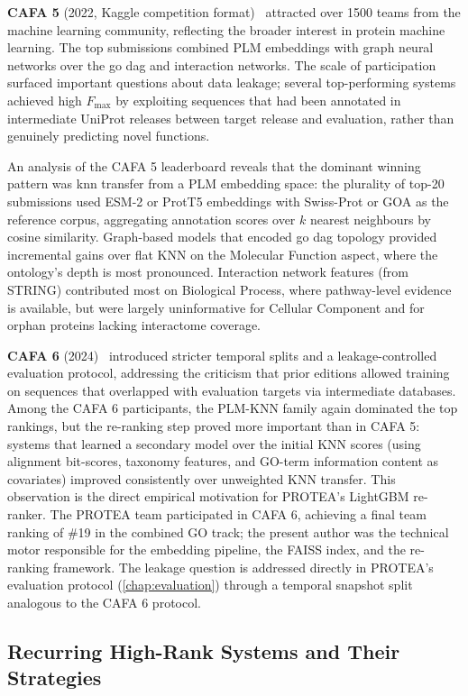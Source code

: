 \textbf{CAFA 5} (2022, Kaggle competition format)~\cite{cafa5_2023} attracted
over 1500 teams from the machine learning community, reflecting the broader
interest in protein machine learning. The top submissions combined PLM embeddings
with graph neural networks over the \gls{go} \gls{dag} and interaction networks.
The scale of participation surfaced important questions about data leakage; several
top-performing systems achieved high $F_{\max}$ by exploiting sequences that had
been annotated in intermediate UniProt releases between target release and
evaluation, rather than genuinely predicting novel functions.

An analysis of the CAFA 5 leaderboard reveals that the dominant winning pattern
was \gls{knn} transfer from a PLM embedding space: the plurality of top-20
submissions used ESM-2 or ProtT5 embeddings with Swiss-Prot or GOA as the
reference corpus, aggregating annotation scores over $k$ nearest neighbours by
cosine similarity. Graph-based models that encoded \gls{go} \gls{dag} topology
provided incremental gains over flat KNN on the Molecular Function aspect, where
the ontology's depth is most pronounced. Interaction network features (from
STRING) contributed most on Biological Process, where pathway-level evidence is
available, but were largely uninformative for Cellular Component and for orphan
proteins lacking interactome coverage.

\textbf{CAFA 6} (2024)~\cite{cafa6_2024} introduced stricter temporal splits and
a leakage-controlled evaluation protocol, addressing the criticism that prior
editions allowed training on sequences that overlapped with evaluation targets via
intermediate databases. Among the CAFA 6 participants, the PLM-KNN family again
dominated the top rankings, but the re-ranking step proved more important than in
CAFA 5: systems that learned a secondary model over the initial KNN scores (using
alignment bit-scores, taxonomy features, and GO-term information content as
covariates) improved consistently over unweighted KNN transfer. This observation
is the direct empirical motivation for PROTEA's LightGBM re-ranker. The PROTEA
team participated in CAFA 6, achieving a final team ranking of \#19 in the combined
GO track; the present author was the technical motor responsible for the embedding
pipeline, the FAISS index, and the re-ranking framework. The leakage question is
addressed directly in PROTEA's evaluation protocol (\cref{chap:evaluation})
through a temporal snapshot split analogous to the CAFA 6 protocol.

\subsection{Recurring High-Rank Systems and Their Strategies}
\label{subsec:related-cafa-top-systems}

